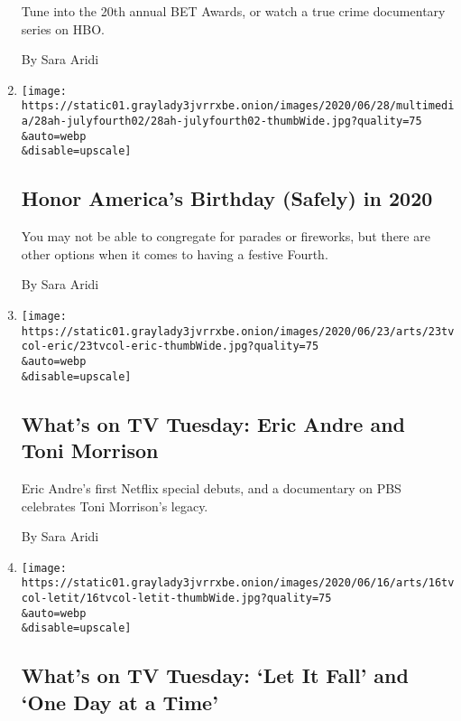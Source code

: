 \begin{enumerate}
  Tune into the 20th annual BET Awards, or watch a true crime
  documentary series on HBO.

  By Sara Aridi
\item
  \href{/2020/06/26/at-home/celebrate-fourth-of-july-coronavirus.html}{}

  \texttt{[image: https://static01.graylady3jvrrxbe.onion/images/2020/06/28/multimedia/28ah-julyfourth02/28ah-julyfourth02-thumbWide.jpg?quality=75\\\&auto=webp\\\&disable=upscale]}

  \hypertarget{honor-americas-birthday-safely-in-2020}{%
  \subsection{Honor America's Birthday (Safely) in
  2020}\label{honor-americas-birthday-safely-in-2020}}

  You may not be able to congregate for parades or fireworks, but there
  are other options when it comes to having a festive Fourth.

  By Sara Aridi
\item
  \href{/2020/06/23/arts/television/whats-on-tv-tuesday-eric-andre-and-toni-morrison.html}{}

  \texttt{[image: https://static01.graylady3jvrrxbe.onion/images/2020/06/23/arts/23tvcol-eric/23tvcol-eric-thumbWide.jpg?quality=75\\\&auto=webp\\\&disable=upscale]}

  \hypertarget{whats-on-tv-tuesday-eric-andre-and-toni-morrison}{%
  \subsection{What's on TV Tuesday: Eric Andre and Toni
  Morrison}\label{whats-on-tv-tuesday-eric-andre-and-toni-morrison}}

  Eric Andre's first Netflix special debuts, and a documentary on PBS
  celebrates Toni Morrison's legacy.

  By Sara Aridi
\item
  \href{/2020/06/16/arts/television/whats-on-tv-tuesday-let-it-fall-and-one-day-at-a-time.html}{}

  \texttt{[image: https://static01.graylady3jvrrxbe.onion/images/2020/06/16/arts/16tvcol-letit/16tvcol-letit-thumbWide.jpg?quality=75\\\&auto=webp\\\&disable=upscale]}

  \hypertarget{whats-on-tv-tuesday-let-it-fall-and-one-day-at-a-time}{%
  \subsection{What's on TV Tuesday: `Let It Fall' and `One Day at a
  Time'}\label{whats-on-tv-tuesday-let-it-fall-and-one-day-at-a-time}}


\end{enumerate}

